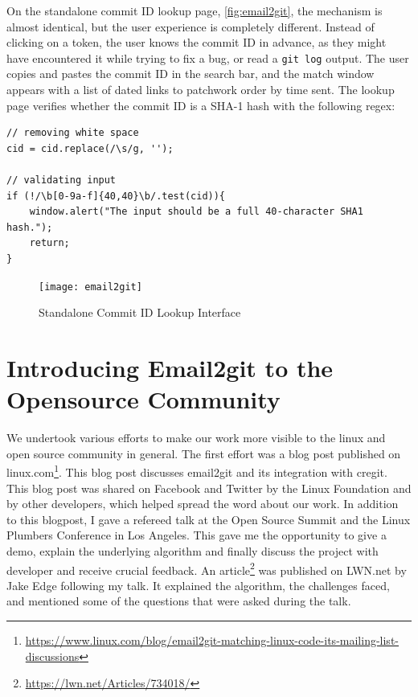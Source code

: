 On the standalone commit ID lookup page, \autoref{fig:email2git}, the mechanism is almost identical, but the user experience is completely different. Instead of clicking on a token, the user knows the commit ID in advance, as they might have encountered it while trying to fix a bug, or read a \texttt{git log} output. The user copies and pastes the commit ID in the search bar, and the match window appears with a list of dated links to patchwork order by time sent. The lookup page verifies whether the commit ID is a SHA-1 hash with the following regex:



\begin{lstlisting}
// removing white space
cid = cid.replace(/\s/g, '');

// validating input
if (!/\b[0-9a-f]{40,40}\b/.test(cid)){
    window.alert("The input should be a full 40-character SHA1 hash.");
    return;
}
\end{lstlisting}

\begin{figure}[htb]
\centering
\texttt{[image: email2git]}
\caption{Standalone Commit ID Lookup Interface}
\label{fig:email2git}
\end{figure}



\section{Introducing Email2git to the Opensource Community}

We undertook various efforts to make our work more visible to the linux and open source community in general. The first effort was a blog post published on linux.com\footnote{\url{https://www.linux.com/blog/email2git-matching-linux-code-its-mailing-list-discussions}}. This blog post discusses email2git and its integration with cregit. This blog post was shared on Facebook and Twitter by the Linux Foundation and by other developers, which helped spread the word about our work. In addition to this blogpost, I gave a refereed talk at the Open Source Summit and the Linux Plumbers Conference in Los Angeles. This gave me the opportunity to give a demo, explain the underlying algorithm and finally discuss the project with developer and receive crucial feedback. An article\footnote{\url{https://lwn.net/Articles/734018/}} was published on LWN.net by Jake Edge following my talk. It explained the algorithm, the challenges faced, and mentioned some of the questions that were asked during the talk.


